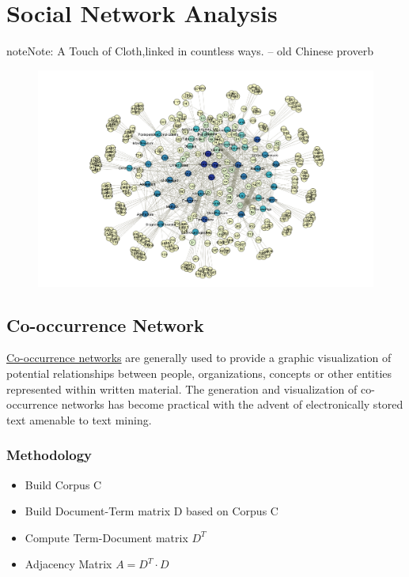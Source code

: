 \documentclass[letterpaper,11pt,english]{sphinxmanual}
\begin{document}
\chapter{Social Network Analysis}
\label{socialnetwork:socialnetwork}\label{socialnetwork:id5}\label{socialnetwork::doc}\label{socialnetwork:social-network-analysis}
\begin{notice}{note}{Note:}
A Touch of Cloth,linked in countless ways. -- old Chinese proverb
\end{notice}
\begin{figure}[htbp]
\centering

\includegraphics{net_work.png}
\end{figure}


\section{Co-occurrence Network}
\label{socialnetwork:co-occurrence-network}
\href{https://en.wikipedia.org/wiki/Co-occurrence\_networks}{Co-occurrence networks} are generally used to provide a graphic visualization of potential relationships between people, organizations, concepts or other entities represented within written material. The generation and visualization of co-occurrence networks has become practical with the advent of electronically stored text amenable to text mining.


\subsection{Methodology}
\label{socialnetwork:methodology}\begin{itemize}
\item {} 
Build Corpus C

\item {} 
Build Document-Term matrix D based on Corpus C

\item {} 
Compute Term-Document matrix \(D^T\)

\item {} 
Adjacency Matrix \(A =D^T\cdot D\)

\end{itemize}
\end{document}

